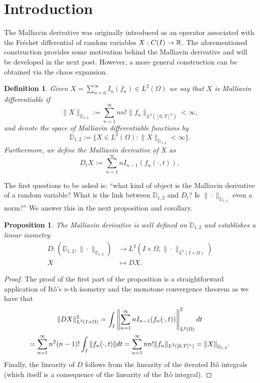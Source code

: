 \documentclass[12pt]{article}
\newtheorem{proposition}{Proposition}
\newtheorem{definition}{Definition}
\begin{document}
\section{Introduction}
The Malliavin derivative was originally introduced as an operator associated with the Fréchet differential of random variables $X: C(I)\to {\mathbb R}$. The aforementioned construction provides some motivation behind the Malliavin derivative and will be developed in the next post. However, a more general construction  can be obtained via the chaos expansion.
\begin{definition}
	Given $X=\sum_{n=0}^{\infty} I_n(f_n)\in L^2(\Omega)$ we say that $X$ is \emph{Malliavin differentiable} if
	\begin{equation*}
		\|X\|_{\mathbb{D}_{1,2}}:=\sum_{n=1}^{\infty} n n!\|f_{n}\|_{L^2([0,T]^n)}<\infty,
	\end{equation*}
	and denote the space of Malliavin differentiable functions by
	\begin{equation*}
		\mathbb{D}_{1,2}:=\{X\in L^2(\Omega):\|X\|_{\mathbb{D}_{1,2}}<\infty\}.
	\end{equation*}
	Furthermore, we define the \emph{Malliavin derivative} of $X$ as
	\begin{equation*}
		D_tX:=\sum_{n=1}^{\infty} n I_{n-1}(f_{n}(\cdot ,t)),
	\end{equation*}
\end{definition}
The first questions to be asked is: ``what kind of object is the Malliavin derivative of a random variable? What is the link between $\mathbb{D}_{1,2}$ and $D_t$? Is $\|\cdot \|_{\mathbb{D}_{1,2}}$ even a norm?'' We answer this in the next proposition and corollary.
\begin{proposition}
	The Malliavin derivative is well defined on  $\mathbb{D}_{1,2}$ and establishes a linear isometry
	\begin{align*}
		D: (\mathbb{D}_{1,2},\|\cdot \|_{\mathbb{D}_{1,2}}) & \longrightarrow L^2(I\times\Omega,\|\cdot \|_{L^2(I\times\Omega)}) \\
		X                                                   & \longmapsto D  X
		.\end{align*}
\end{proposition}
\begin{proof}
	The proof of the first part of the proposition is a straightforward application of Itô's $n$-th isometry and the monotone convergence theorem as we have that
	\begin{multline*}
		\|D  X\|^2_{L^2(I\times\Omega)}=\int_{I}\left\|\sum_{n=1}^{\infty} n I_{n-1}(f_{n}(\cdot ,t))\right\|_{L^2(\Omega)}^2 d t\\=\sum_{n=1}^{\infty} n^2(n-1)!\int_{I}\|f_n(\cdot ,t)\| dt=\sum_{n=1}^{\infty} n n!\|f_{n}\|_{L^2([0,T]^n)}=\norm{X}_{\mathbb{D}_{1,2}}.
	\end{multline*}
	Finally, the linearity of $D$ follows from the linearity of the iterated Itô integrals (which itself is a consequence of the linearity of the Itô integral).
\end{proof}
\end{document}
